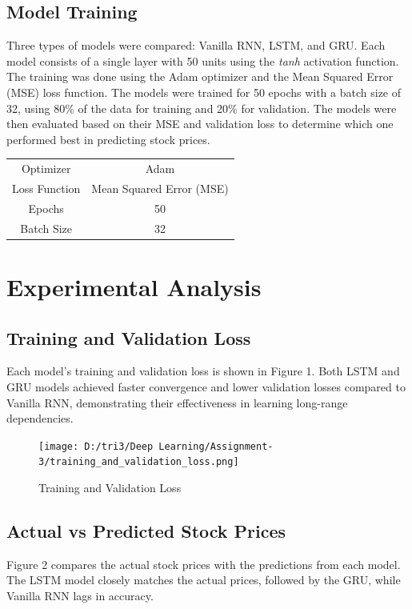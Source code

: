 \documentclass[10pt,twocolumn,a4paper]{article}
\begin{document}
\subsection{Model Training}
Three types of models were compared: Vanilla RNN, LSTM, and GRU. Each model consists of a single layer with 50 units using the \textit{tanh} activation function. The training was done using the Adam optimizer and the Mean Squared Error (MSE) loss function. The models were trained for 50 epochs with a batch size of 32, using 80\% of the data for training and 20\% for validation. The models were then evaluated based on their MSE and validation loss to determine which one performed best in predicting stock prices.

\begin{table}[h]
\centering
\begin{tabular}{|c|c|}


\hline
Optimizer & Adam  \\
Loss Function        & Mean Squared Error (MSE) \\
Epochs        & 50 \\
Batch Size & 32  \\
\hline
\end{tabular}

\end{table}

\section{Experimental Analysis}

\subsection{Training and Validation Loss}
Each model's training and validation loss is shown in Figure 1. Both LSTM and GRU models achieved faster convergence and lower validation losses compared to Vanilla RNN, demonstrating their effectiveness in learning long-range dependencies.

\begin{figure}[htbp]
    \centering
    \texttt{[image: D:/tri3/Deep Learning/Assignment-3/training\_and\_validation\_loss.png]}
    \caption{Training and Validation Loss }
    \label{fig1: Implementation of AlexNet}
\end{figure}
\subsection{Actual vs Predicted Stock Prices}
Figure 2 compares the actual stock prices with the predictions from each model. The LSTM model closely matches the actual prices, followed by the GRU, while Vanilla RNN lags in accuracy.
\end{document}
